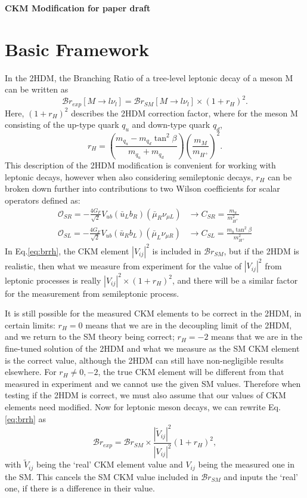 \documentclass[11pt]{article}
\newcommand{\tVVt}{\frac{|\tilde{V}_{ij}|^2}{|V_{ij}|^2}}
\begin{document}
{\Large\bfseries CKM Modification for paper draft}
\section{Basic Framework}
In the 2HDM, the Branching Ratio of a tree-level leptonic decay of a meson M can be written as
\begin{equation}
    \label{eq:brrh}
    \mathcal{B}r_{exp}[M\to l\nu_l] = \mathcal{B}r_{SM}[M\to l\nu_l]\times(1+r_H)^2.
\end{equation}
Here, $(1+r_H)^2$ describes the 2HDM correction factor, where for the meson M consisting of the up-type quark $q_u$ and down-type quark $q_d$,
\begin{equation}
    r_H = \left(\frac{m_{q_u}-m_{q_d}\tan^2\beta}{m_{q_u}+m_{q_d}}\right)\left(\frac{m_M}{m_{H^+}}\right)^2.
\end{equation}
This description of the 2HDM modification is convenient for working with leptonic decays, however when also considering semileptonic decays, $r_H$ can be broken down further into contributions to two Wilson coefficients for scalar operators defined as:
\begin{align}
    \label{eq:csr}
    \mathcal{O}_{SR} = -\frac{4G_F}{\sqrt{2}}V_{ub}(\bar{u}_Lb_R)(\bar{\mu}_R\nu_{\mu L}) &\to C_{SR} = \frac{m_u}{m_{H^+}^2} \\
    \label{eq:csl}
    \mathcal{O}_{SL} = -\frac{4G_F}{\sqrt{2}}V_{ub}(\bar{u}_Rb_L)(\bar{\mu}_L\nu_{\mu R}) &\to C_{SL} = \frac{m_b\tan^2\beta}{m_{H^+}^2} 
\end{align}
In Eq.\eqref{eq:brrh}, the CKM element $|V_{ij}|^2$ is included in $\mathcal{B}r_{SM}$, but if the 2HDM is realistic, then what we measure from experiment for the value of $|V_{ij}|^2$ from leptonic processes is really $|V_{ij}|^2\times(1+r_H)^2$, and there will be a similar factor for the measurement from semileptonic process.

It is still possible for the measured CKM elements to be correct in the 2HDM, in certain limits:
$r_H=0$ means that we are in the decoupling limit of the 2HDM, and we return to the SM theory being correct;
$r_H=-2$ means that we are in the fine-tuned solution of the 2HDM and what we measure as the SM CKM element is the correct value, although the 2HDM can still have non-negligible results elsewhere.
For $r_H\neq0,-2$, the true CKM element will be different from that measured in experiment and we cannot use the given SM values.
Therefore when testing if the 2HDM is correct, we must also assume that our values of CKM elements need modified.
Now for leptonic meson decays, we can rewrite Eq.\eqref{eq:brrh} as
\begin{equation}
    \mathcal{B}r_{exp} = \mathcal{B}r_{SM}\times\tVVt(1+r_H)^2,
\end{equation}
with $\tilde{V}_{ij}$ being the `real' CKM element value and $V_{ij}$ being the measured one in the SM.
This cancels the SM CKM value included in $\mathcal{B}r_{SM}$ and inputs the `real' one, if there is a difference in their value.
\end{document}

